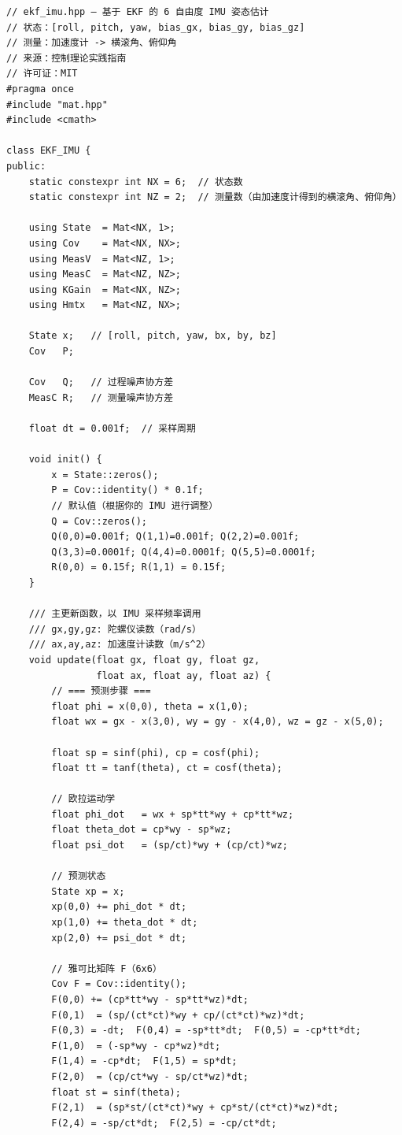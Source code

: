 \begin{verbatim}
// ekf_imu.hpp — 基于 EKF 的 6 自由度 IMU 姿态估计
// 状态：[roll, pitch, yaw, bias_gx, bias_gy, bias_gz]
// 测量：加速度计 -> 横滚角、俯仰角
// 来源：控制理论实践指南
// 许可证：MIT
#pragma once
#include "mat.hpp"
#include <cmath>

class EKF_IMU {
public:
    static constexpr int NX = 6;  // 状态数
    static constexpr int NZ = 2;  // 测量数（由加速度计得到的横滚角、俯仰角）

    using State  = Mat<NX, 1>;
    using Cov    = Mat<NX, NX>;
    using MeasV  = Mat<NZ, 1>;
    using MeasC  = Mat<NZ, NZ>;
    using KGain  = Mat<NX, NZ>;
    using Hmtx   = Mat<NZ, NX>;

    State x;   // [roll, pitch, yaw, bx, by, bz]
    Cov   P;

    Cov   Q;   // 过程噪声协方差
    MeasC R;   // 测量噪声协方差

    float dt = 0.001f;  // 采样周期

    void init() {
        x = State::zeros();
        P = Cov::identity() * 0.1f;
        // 默认值（根据你的 IMU 进行调整）
        Q = Cov::zeros();
        Q(0,0)=0.001f; Q(1,1)=0.001f; Q(2,2)=0.001f;
        Q(3,3)=0.0001f; Q(4,4)=0.0001f; Q(5,5)=0.0001f;
        R(0,0) = 0.15f; R(1,1) = 0.15f;
    }

    /// 主更新函数，以 IMU 采样频率调用
    /// gx,gy,gz: 陀螺仪读数（rad/s）
    /// ax,ay,az: 加速度计读数（m/s^2）
    void update(float gx, float gy, float gz,
                float ax, float ay, float az) {
        // === 预测步骤 ===
        float phi = x(0,0), theta = x(1,0);
        float wx = gx - x(3,0), wy = gy - x(4,0), wz = gz - x(5,0);

        float sp = sinf(phi), cp = cosf(phi);
        float tt = tanf(theta), ct = cosf(theta);

        // 欧拉运动学
        float phi_dot   = wx + sp*tt*wy + cp*tt*wz;
        float theta_dot = cp*wy - sp*wz;
        float psi_dot   = (sp/ct)*wy + (cp/ct)*wz;

        // 预测状态
        State xp = x;
        xp(0,0) += phi_dot * dt;
        xp(1,0) += theta_dot * dt;
        xp(2,0) += psi_dot * dt;

        // 雅可比矩阵 F（6x6）
        Cov F = Cov::identity();
        F(0,0) += (cp*tt*wy - sp*tt*wz)*dt;
        F(0,1)  = (sp/(ct*ct)*wy + cp/(ct*ct)*wz)*dt;
        F(0,3) = -dt;  F(0,4) = -sp*tt*dt;  F(0,5) = -cp*tt*dt;
        F(1,0)  = (-sp*wy - cp*wz)*dt;
        F(1,4) = -cp*dt;  F(1,5) = sp*dt;
        F(2,0)  = (cp/ct*wy - sp/ct*wz)*dt;
        float st = sinf(theta);
        F(2,1)  = (sp*st/(ct*ct)*wy + cp*st/(ct*ct)*wz)*dt;
        F(2,4) = -sp/ct*dt;  F(2,5) = -cp/ct*dt;


\end{verbatim}
